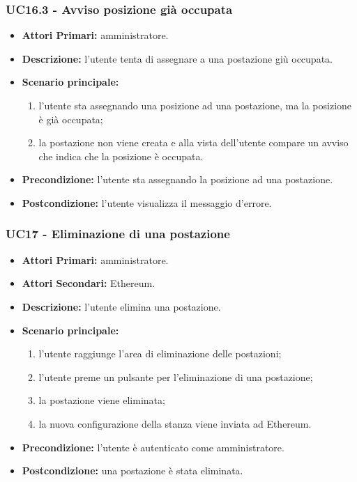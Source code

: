 \subsubsection{UC16.3 - Avviso posizione già occupata}
\begin{itemize}
	\item\textbf{Attori Primari:}
	amministratore.
	\item\textbf{Descrizione:}
	l'utente tenta di assegnare a una postazione giù occupata.
	\item\textbf{Scenario principale:}
	\begin{enumerate}
		\item l'utente sta assegnando una posizione ad una postazione, ma la posizione è già occupata;
		\item la postazione non viene creata e alla vista dell'utente compare un avviso che indica che la posizione è occupata.
	\end{enumerate}
	\item\textbf{Precondizione:}
	l'utente sta assegnando la posizione ad una postazione.
	\item\textbf{Postcondizione:}
	l'utente visualizza il messaggio d'errore.
\end{itemize}

\subsubsection{UC17 - Eliminazione di una postazione}
\begin{itemize}
	\item\textbf{Attori Primari:}
	amministratore.
	\item\textbf{Attori Secondari:}
	Ethereum.
	\item\textbf{Descrizione:}
	l'utente elimina una postazione.
	\item\textbf{Scenario principale:} 
	\begin{enumerate}
		\item l'utente raggiunge l'area di eliminazione delle postazioni;
		\item l'utente preme un pulsante per l'eliminazione di una postazione;
		\item la postazione viene eliminata;
		\item la nuova configurazione della stanza viene inviata ad Ethereum.
	\end{enumerate}
	\item\textbf{Precondizione:} 
	l'utente è autenticato come amministratore.
	\item\textbf{Postcondizione:}
	una postazione è stata eliminata.
\end{itemize}

